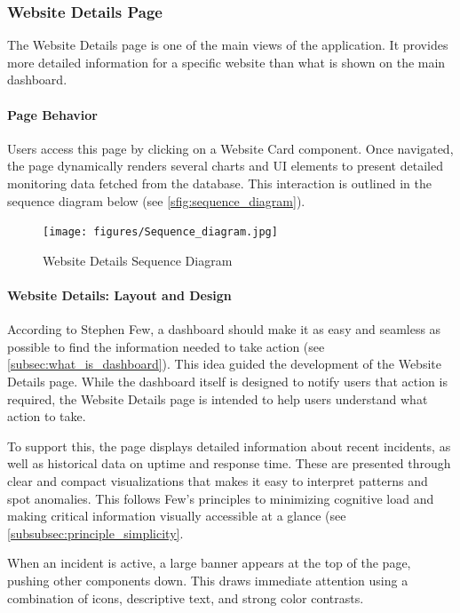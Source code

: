 \subsubsection{Website Details Page}
The Website Details page is one of the main views of the application. It provides more detailed information for a specific website than what is shown on the main dashboard.

\paragraph{Page Behavior}
Users access this page by clicking on a Website Card component. Once navigated, the page dynamically renders several charts and UI elements to present detailed monitoring data fetched from the database. This interaction is outlined in the sequence diagram below (see \autoref{sfig:sequence_diagram}).

\begin{figure}[htbp]
        \centering
        \texttt{[image: figures/Sequence\_diagram.jpg]}
        \caption{Website Details Sequence Diagram}
        \label{sfig:sequence_diagram}
\end{figure}

\paragraph{Website Details: Layout and Design}

According to Stephen Few, a dashboard should make it as easy and seamless as possible to find the information needed to take action (see \ref{subsec:what_is_dashboard}). This idea guided the development of the Website Details page. While the dashboard itself is designed to notify users that action is required, the Website Details page is intended to help users understand what action to take.

To support this, the page displays detailed information about recent incidents, as well as historical data on uptime and response time. These are presented through clear and compact visualizations that makes it easy to interpret patterns and spot anomalies. This follows Few's principles to minimizing cognitive load and making critical information visually accessible at a glance (see \ref{subsubsec:principle_simplicity}.

When an incident is active, a large banner appears at the top of the page, pushing other components down. This draws immediate attention using a combination of icons, descriptive text, and strong color contrasts. 

